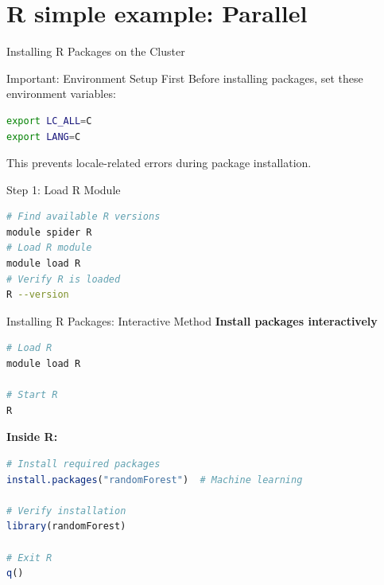 \documentclass[aspectratio=169]{beamer}
\begin{document}
\section{R simple example: Parallel }


\begin{frame}[fragile]{Installing R Packages on the Cluster}
\begin{alertblock}{Important: Environment Setup First}
Before installing packages, set these environment variables:
\begin{lstlisting}[language=bash]
export LC_ALL=C
export LANG=C
\end{lstlisting}
This prevents locale-related errors during package installation.
\end{alertblock}

\begin{block}{Step 1: Load R Module}
\begin{lstlisting}[language=bash]
# Find available R versions
module spider R
# Load R module
module load R
# Verify R is loaded
R --version
\end{lstlisting}
\end{block}
\end{frame}

\begin{frame}[fragile]{Installing R Packages: Interactive Method}
\textbf{Install packages interactively}

\begin{lstlisting}[language=bash]
# Load R
module load R

# Start R
R
\end{lstlisting}

\vspace{0.5em}
\textbf{Inside R:}
\begin{lstlisting}[language=R]
# Install required packages
install.packages("randomForest")  # Machine learning

# Verify installation
library(randomForest)

# Exit R
q()
\end{lstlisting}
\end{frame}
\end{document}
